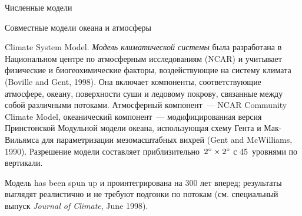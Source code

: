 \begin{chapter}{Численные модели}
\begin{section}{Совместные модели океана и атмосферы}
\begin{paragraph}{Climate System Model.}%
\emph{Модель климатической системы} была разработана в Национальном 
центре по атмосферным исследованиям (NCAR) и учитывает
физические и биогеохимические факторы, воздействующие на систему
климата (Boville and Gent, 1998). Она включает компоненты, соответствующие
атмосфере, океану, поверхности суши и ледовому покрову, связанные между
собой различными потоками. Атмосферный компонент~--- NCAR Community
Climate Model, океанический компонент~--- модифицированная версия
Принстонской Модульной модели океана, использующая схему Гента и Мак-Вильямса 
для параметризации мезомасштабных вихрей 
(Gent and McWilliams, 1990). Разрешение модели составляет
приблизительно~${2}^\circ\times{2}^\circ$ с 45~уровнями по
вертикали.
%

Модель has been spun up и проинтегрирована на 300 лет вперед; результаты 
выглядят реалистично и не требуют подгонки по потокам%
(см. специальный выпуск \textsl{Journal of Climate}, June 1998).
%
\end{paragraph}


\end{section}
\end{chapter}

